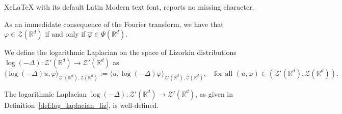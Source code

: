 \documentclass[10pt,a4paper]{amsart}
\newcommand{\R}{\mathbb{R}}
\begin{document}
XeLaTeX with its default Latin Modern text font, reports no missing character.
\begin{remark}\label{rem:psi}
	As an immedidate consequence of the Fourier transform, we have that $\varphi \in \mathcal{Z}(\R^d)$ if and only if $\hat{\varphi}\in \Psi(\R^d)$. 
\end{remark}

\begin{definition}
	\label{def:log_laplacian_liz}
	We define the logarithmic Laplacian on the space of Lizorkin distributions $\log(-\Delta):\mathcal{Z}'(\mathbb{R}^d)\rightarrow\mathcal{Z}'(\mathbb{R}^d)$ as
		\begin{equation}\label{eqn:log_lizorkin}
			\langle \log(-\Delta)u,\varphi \rangle_{\mathcal{Z}'(\mathbb{R}^d),\mathcal{Z}(\mathbb{R}^d)}:=		\langle u,\log(-\Delta)\varphi \rangle_{\mathcal{Z}'(\mathbb{R}^d),\mathcal{Z}(\mathbb{R}^d)}, \quad \text{for all $(u,\varphi) \in (\mathcal{Z}'(\mathbb{R}^d),\mathcal{Z}(\mathbb{R}^d))$}.
		\end{equation}
\end{definition}

\begin{proposition}
	The logarithmic Laplacian $\log(-\Delta):\mathcal{Z}'(\R^d)\rightarrow \mathcal{Z}'(\R^d)$, as given in Definition~\ref{def:log_laplacian_liz}, is well-defined. 
\end{proposition}
\end{document}
